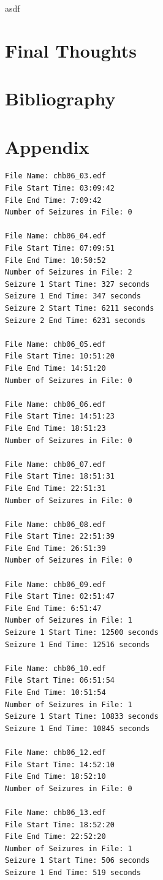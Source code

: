 \documentclass[12pt]{article}
\begin{document}
asdf


\section{Final Thoughts}




\pagebreak
\section{Bibliography}


\pagebreak
\section{Appendix}

\begin{lstlisting}[style=logstyle, caption={Example Summary file from the \acrshort{chb} \acrshort{eeg} dataset.}, label={lst:summary-file}]
File Name: chb06_03.edf
File Start Time: 03:09:42
File End Time: 7:09:42
Number of Seizures in File: 0

File Name: chb06_04.edf
File Start Time: 07:09:51
File End Time: 10:50:52
Number of Seizures in File: 2
Seizure 1 Start Time: 327 seconds
Seizure 1 End Time: 347 seconds
Seizure 2 Start Time: 6211 seconds
Seizure 2 End Time: 6231 seconds

File Name: chb06_05.edf
File Start Time: 10:51:20
File End Time: 14:51:20
Number of Seizures in File: 0

File Name: chb06_06.edf
File Start Time: 14:51:23
File End Time: 18:51:23
Number of Seizures in File: 0

File Name: chb06_07.edf
File Start Time: 18:51:31
File End Time: 22:51:31
Number of Seizures in File: 0

File Name: chb06_08.edf
File Start Time: 22:51:39
File End Time: 26:51:39
Number of Seizures in File: 0

File Name: chb06_09.edf
File Start Time: 02:51:47
File End Time: 6:51:47
Number of Seizures in File: 1
Seizure 1 Start Time: 12500 seconds
Seizure 1 End Time: 12516 seconds

File Name: chb06_10.edf
File Start Time: 06:51:54
File End Time: 10:51:54
Number of Seizures in File: 1
Seizure 1 Start Time: 10833 seconds
Seizure 1 End Time: 10845 seconds

File Name: chb06_12.edf
File Start Time: 14:52:10
File End Time: 18:52:10
Number of Seizures in File: 0

File Name: chb06_13.edf
File Start Time: 18:52:20
File End Time: 22:52:20
Number of Seizures in File: 1
Seizure 1 Start Time: 506 seconds
Seizure 1 End Time: 519 seconds


\end{lstlisting}
\end{document}
